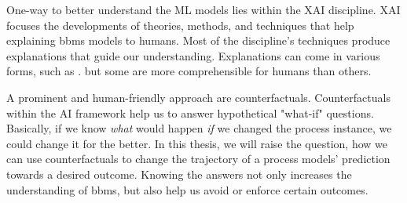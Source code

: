 \documentclass[./../../paper.tex]{subfiles}
\begin{document}

One-way to better understand the \gls{ML} models lies within the \gls{XAI} discipline. XAI focuses the developments of theories, methods, and techniques that help explaining \glspl{bbm} models to humans. Most of the discipline's techniques produce explanations that guide our understanding. Explanations can come in various forms, such as \needscite{}. but some are more comprehensible for humans than others. 

A prominent and human-friendly approach are counterfactuals\needscite{}. Counterfactuals within the AI framework help us to answer hypothetical "what-if" questions. Basically, if we know \emph{what} would happen \emph{if} we changed the process instance, we could change it for the better. In this thesis, we will raise the question, how we can use counterfactuals to change the trajectory of a process models' prediction towards a desired outcome. Knowing the answers not only increases the understanding of \glspl{bbm}, but also help us avoid or enforce certain outcomes. 
\end{document}
